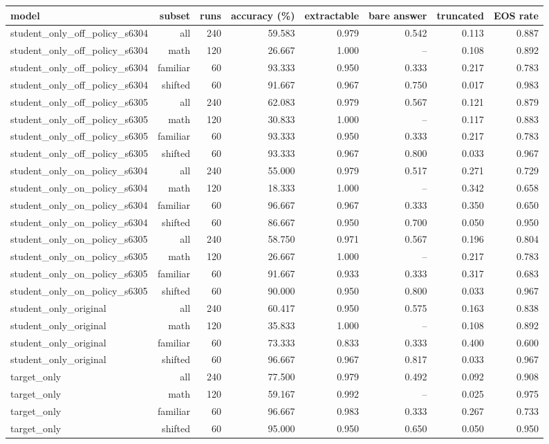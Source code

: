 \begin{tabular}{lrrrrrrr}
\toprule
model & subset & runs & accuracy (\%) & extractable & bare answer & truncated & EOS rate \\
\midrule
student\_only\_off\_policy\_s6304 & all & 240 & 59.583 & 0.979 & 0.542 & 0.113 & 0.887 \\
student\_only\_off\_policy\_s6304 & math & 120 & 26.667 & 1.000 & -- & 0.108 & 0.892 \\
student\_only\_off\_policy\_s6304 & familiar & 60 & 93.333 & 0.950 & 0.333 & 0.217 & 0.783 \\
student\_only\_off\_policy\_s6304 & shifted & 60 & 91.667 & 0.967 & 0.750 & 0.017 & 0.983 \\
student\_only\_off\_policy\_s6305 & all & 240 & 62.083 & 0.979 & 0.567 & 0.121 & 0.879 \\
student\_only\_off\_policy\_s6305 & math & 120 & 30.833 & 1.000 & -- & 0.117 & 0.883 \\
student\_only\_off\_policy\_s6305 & familiar & 60 & 93.333 & 0.950 & 0.333 & 0.217 & 0.783 \\
student\_only\_off\_policy\_s6305 & shifted & 60 & 93.333 & 0.967 & 0.800 & 0.033 & 0.967 \\
student\_only\_on\_policy\_s6304 & all & 240 & 55.000 & 0.979 & 0.517 & 0.271 & 0.729 \\
student\_only\_on\_policy\_s6304 & math & 120 & 18.333 & 1.000 & -- & 0.342 & 0.658 \\
student\_only\_on\_policy\_s6304 & familiar & 60 & 96.667 & 0.967 & 0.333 & 0.350 & 0.650 \\
student\_only\_on\_policy\_s6304 & shifted & 60 & 86.667 & 0.950 & 0.700 & 0.050 & 0.950 \\
student\_only\_on\_policy\_s6305 & all & 240 & 58.750 & 0.971 & 0.567 & 0.196 & 0.804 \\
student\_only\_on\_policy\_s6305 & math & 120 & 26.667 & 1.000 & -- & 0.217 & 0.783 \\
student\_only\_on\_policy\_s6305 & familiar & 60 & 91.667 & 0.933 & 0.333 & 0.317 & 0.683 \\
student\_only\_on\_policy\_s6305 & shifted & 60 & 90.000 & 0.950 & 0.800 & 0.033 & 0.967 \\
student\_only\_original & all & 240 & 60.417 & 0.950 & 0.575 & 0.163 & 0.838 \\
student\_only\_original & math & 120 & 35.833 & 1.000 & -- & 0.108 & 0.892 \\
student\_only\_original & familiar & 60 & 73.333 & 0.833 & 0.333 & 0.400 & 0.600 \\
student\_only\_original & shifted & 60 & 96.667 & 0.967 & 0.817 & 0.033 & 0.967 \\
target\_only & all & 240 & 77.500 & 0.979 & 0.492 & 0.092 & 0.908 \\
target\_only & math & 120 & 59.167 & 0.992 & -- & 0.025 & 0.975 \\
target\_only & familiar & 60 & 96.667 & 0.983 & 0.333 & 0.267 & 0.733 \\
target\_only & shifted & 60 & 95.000 & 0.950 & 0.650 & 0.050 & 0.950 \\
\bottomrule
\end{tabular}
